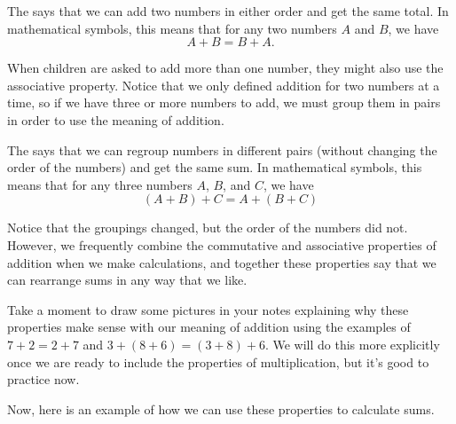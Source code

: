 \documentclass{ximera}
\begin{document}
\begin{definition}
The  says that we can add two numbers in either order and get the same total. In mathematical symbols, this means that for any two numbers $A$ and $B$, we have
\[
A + B = B + A.
\]
\end{definition}

When children are asked to add more than one number, they might also use the associative property. Notice that we only defined addition for two numbers at a time, so if we have three or more numbers to add, we must group them in pairs in order to use the meaning of addition.
\begin{definition}
The  says that we can regroup numbers in different pairs (without changing the order of the numbers) and get the same sum. In mathematical symbols, this means that for any three numbers $A$, $B$, and $C$, we have
\[
(A + B) + C = A + (B+C)
\]
\end{definition}
Notice that the groupings changed, but the order of the numbers did not. However, we frequently combine the commutative and associative properties of addition when we make calculations, and together these properties say that we can rearrange sums in any way that we like.

Take a moment to draw some pictures in your notes explaining why these properties make sense with our meaning of addition using the examples of $7+2 = 2+7$ and $3+(8+6) = (3+8)+6$. We will do this more explicitly once we are ready to include the properties of multiplication, but it's good to practice now.

Now, here is an example of how we can use these properties to calculate sums.
\end{document}
